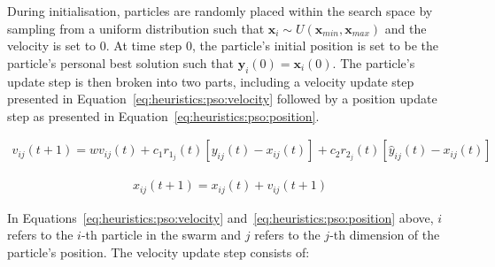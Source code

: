 During initialisation, particles are randomly placed within the search space by sampling from a uniform distribution such that $\boldsymbol{x}_{i} \sim U(\boldsymbol{x}_{min}, \boldsymbol{x}_{max})$ and the velocity is set to 0. At time step 0, the particle's initial position is set to be the particle's personal best solution such that $\boldsymbol{y}_{i}(0) = \boldsymbol{x}_{i}(0)$. The particle's update step is then broken into two parts, including a velocity update step presented in Equation~\eqref{eq:heuristics:pso:velocity} followed by a position update step as presented in Equation~\eqref{eq:heuristics:pso:position}.

\begin{equation}
      \label{eq:heuristics:pso:velocity}
      \begin{split}
            v_{ij}(t+1) = wv_{ij}(t) + c_{1}r_{1_{j}}(t)[y_{ij}(t) - x_{ij}(t)] + c_{2}r_{2_{j}}(t)[\hat{y}_{ij}(t) - x_{ij}(t)]
      \end{split}
\end{equation}

\begin{equation}
      \label{eq:heuristics:pso:position}
      \begin{split}
            x_{ij}(t+1) = x_{ij}(t) + v_{ij}(t+1)
      \end{split}
\end{equation}

In Equations~\eqref{eq:heuristics:pso:velocity} and~\eqref{eq:heuristics:pso:position} above, $i$ refers to the $i$-th particle in the swarm and $j$ refers to the $j$-th dimension of  the particle's position. The velocity update step consists of:

